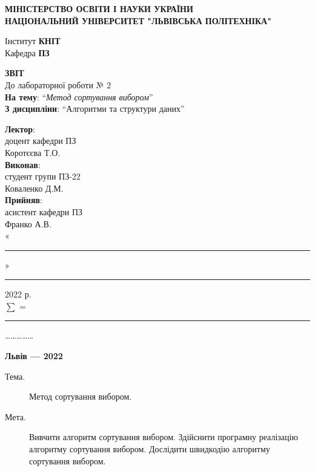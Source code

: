 \documentclass{article}
\newcommand\subject{Алгоритми та структури даних}
\newcommand\lecturer{доцент кафедри ПЗ\\Коротєєва Т.О.}
\newcommand\teacher{асистент кафедри ПЗ\\Франко А.В.}
\newcommand\mygroup{ПЗ-22}
\newcommand\lab{2}
\newcommand\theme{Метод сортування вибором}
\newcommand\purpose{Вивчити алгоритм сортування вибором. Здійснити програмну реалізацію алгоритму сортування вибором. Дослідити швидкодію алгоритму сортування вибором}
\begin{document}
	\begin{normalsize}
		\begin{titlepage}
			\thispagestyle{empty}
			\begin{center}
				\textbf{МІНІСТЕРСТВО ОСВІТИ І НАУКИ УКРАЇНИ\\
					НАЦІОНАЛЬНИЙ УНІВЕРСИТЕТ "ЛЬВІВСЬКА ПОЛІТЕХНІКА"}
			\end{center}
			\begin{flushright}
				Інститут \textbf{КНІТ}\\
				Кафедра \textbf{ПЗ}
			\end{flushright}
			\vspace{200pt}
			\begin{center}
				\textbf{ЗВІТ}\\
				\vspace{10pt}
				До лабораторної роботи № \lab\\
				\textbf{На тему}: “\textit{\theme}”\\
				\textbf{З дисципліни}: “\subject”
			\end{center}
			\vspace{112pt}
			\begin{flushright}
				
				\textbf{Лектор}:\\
				\lecturer\\
				\vspace{28pt}
				\textbf{Виконав}:\\
				
				студент групи \mygroup\\
				Коваленко Д.М.\\
				\vspace{28pt}
				\textbf{Прийняв}:\\
				
				\teacher\\
				
				\vspace{28pt}
				«\rule{1cm}{0.15mm}» \rule{1.5cm}{0.15mm} 2022 р.\\
				$\sum$ = \rule{1cm}{0.15mm}……………\\
				
			\end{flushright}
			\vspace{\fill}
			\begin{center}
				\textbf{Львів — 2022}
			\end{center}
		\end{titlepage}
		
		\begin{description}
			\item[Тема.] \theme.
			\item[Мета.] \purpose.
		\end{description}
		

\end{normalsize}
\end{document}

